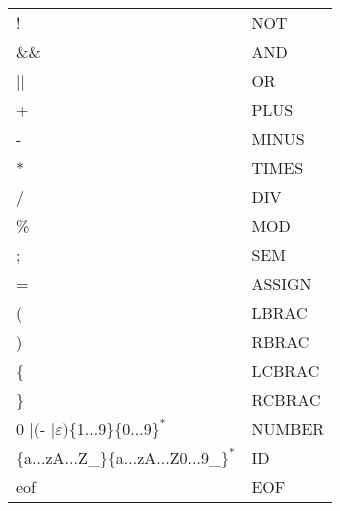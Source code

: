 \begin{exercise}{30}
\begin{longtable}{Ll}
	!          & NOT \\
	\&\&       & AND \\
	||         & OR \\
	
	+          & PLUS \\
	-          & MINUS \\
	*          & TIMES \\
	/          & DIV\\
	\%          & MOD \\
	
	;          & SEM \\
	=          & ASSIGN \\
	(          & LBRAC \\
	)          & RBRAC \\
	\{         & LCBRAC \\
	\}         & RCBRAC\\
	
	0 $\mid ($- $\mid \varepsilon)\{$1$\ldots$9$\}\{$0$\ldots$9$\}^\ast$ & NUMBER \\
	$\{$a$\ldots$zA$\ldots$Z\_$\}\{$a$\ldots$zA$\ldots$Z0$\ldots$9\_$\}^\ast$ & ID \\
	
	eof & EOF \\
	
	\hline
\end{longtable}


\end{exercise}



